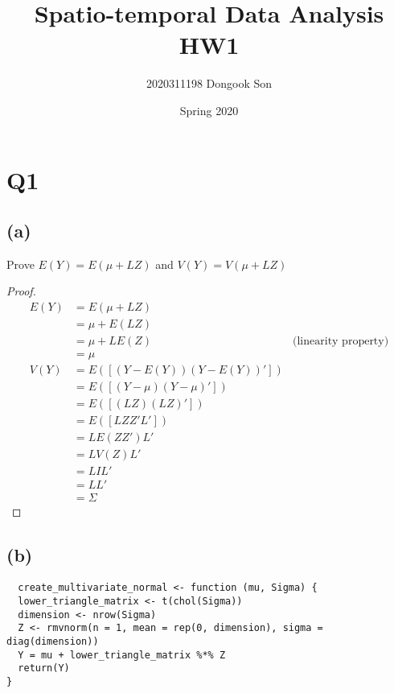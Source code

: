 \documentclass[11pt]{article}
\title{Spatio-temporal Data Analysis HW1}
\author{2020311198 Dongook Son}
\date{Spring 2020}
\begin{document}
\maketitle

\section*{Q1}
\subsection*{(a)}
Prove $E(Y)=E(\mu+LZ)$ and $V(Y)=V(\mu+LZ)$

\begin{proof}
  \begin{align*}
    E(Y) &= E(\mu + LZ) \\
    &= \mu+E(LZ) \\
    &= \mu+LE(Z) & \text{(linearity property)} \\
    &= \mu \\
    V(Y) &= E([(Y-E(Y))(Y-E(Y))']) \\
    &= E([(Y-\mu)(Y-\mu)']) \\
    &= E([(LZ)(LZ)']) \\
    &= E([LZZ'L']) \\
    &= LE(ZZ')L' \\
    &= LV(Z)L' \\
    &= LIL' \\
    &= LL' \\
    &= \Sigma
  \end{align*}
\end{proof}

\subsection*{(b)}

\begin{lstlisting}
  create_multivariate_normal <- function (mu, Sigma) {
  lower_triangle_matrix <- t(chol(Sigma))
  dimension <- nrow(Sigma)
  Z <- rmvnorm(n = 1, mean = rep(0, dimension), sigma = diag(dimension))
  Y = mu + lower_triangle_matrix %*% Z
  return(Y)
}
\end{lstlisting}
\end{document}
